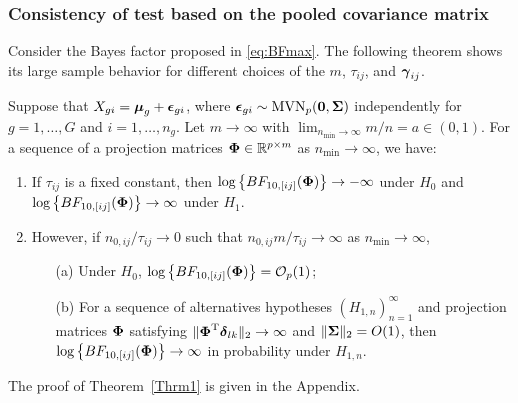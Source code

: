 \documentclass[APA,Times1COL]{WileyNJDv5} %
\def\bzero{{\mathbf 0}}
\def\log{\hbox{log}}
\def\MVN{\hbox{MVN}}
\def\log{\hbox{log}}
\def\trans{^{\rm T}}
\def\bzero{{\mathbf 0}}
\newcommand{\bSigma}{\mbox{\boldmath $\Sigma$}}
\newcommand{\ugamma}            {\mbox{\boldmath$\gamma$}}
\newcommand{\udelta}            {\mbox{\boldmath$\delta$}}
\newcommand{\uepsilon}          {\mbox{\boldmath$\epsilon$}}
\newcommand{\umu}               {\mbox{\boldmath$\mu$}}
\newcommand{\uSigma}            {\mbox{\boldmath$\Sigma$}}
\newcommand{\uPhi}              {\mbox{\boldmath$\Phi$}}
\begin{document}
\subsubsection{Consistency of test based on the pooled covariance matrix}
Consider the Bayes factor proposed in \eqref{eq:BFmax}. The following theorem shows its large sample behavior for different choices of the $m$, $\tau_{ij}$, and $\ugamma_{ij}$. 
\begin{theorem}\label{Thrm1}
Suppose that $X_{gi} = \umu_g + \uepsilon_{gi}$, where $\uepsilon_{gi} \sim \MVN_{p}(\bzero, \uSigma)$ independently for $g = 1, \ldots, G$ and $i = 1,\ldots,n_g$. Let $m \rightarrow \infty$ with $ \lim_{n_{\min} \rightarrow \infty} m / n =  a \in  (0, 1)$. For a sequence of a projection matrices $\uPhi \in \mathbb{R}^{p \times m}$ as $n_{\min} \rightarrow \infty$, we have:
\begin{enumerate}
    \item If $\tau_{ij}$ is a fixed constant, 
    then $\log\left\{BF_{10, [ij]}(\uPhi) \right\} \rightarrow -\infty$ under $H_0$ and $\log\left\{BF_{10, [ij]}(\uPhi) \right\} \rightarrow \infty$ under $H_1$. 
    \item However, if 
    $n_{0,ij}/\tau_{ij} \rightarrow 0$ such that $n_{0,ij}m/\tau_{ij} \rightarrow \infty$ as $n_{\min} \rightarrow \infty$,  
   
    \begin{itemize}
        \item[(a)] Under $H_0$, $\log\left\{BF_{10, [ij]}(\uPhi) \right\} = \mathcal{O}_{p}(1)$;
        \item[(b)] 
        For a sequence of alternatives hypotheses $(H_{1,n})_{n = 1}^\infty$ and projection matrices $\uPhi$ satisfying $\|\uPhi\trans\udelta_{lk}\|_2\to\infty$ and $\|\bSigma\|_2 = O(1)$, then $\log\left\{BF_{10, [ij]}(\uPhi) \right\} \rightarrow \infty$ in probability under $H_{1,n}$. 
    \end{itemize} 
\end{enumerate}
\end{theorem}
The proof of Theorem~\ref{Thrm1} is given in the Appendix.
\end{document}
